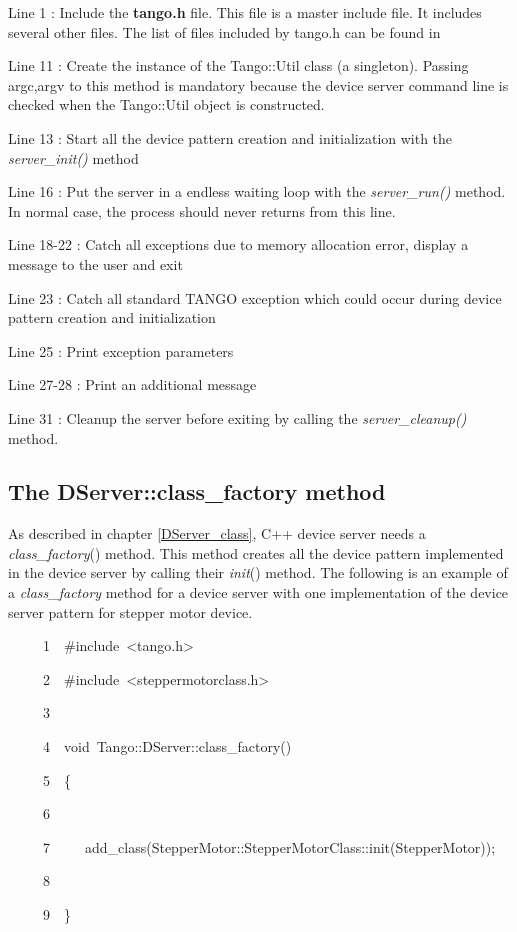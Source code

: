 

Line 1 : Include the \textbf{tango.h} file. This file is a master
include file. It includes several other files. The list of files included
by tango.h can be found in \cite{TANGO_ref_man}

Line 11 : Create the instance of the Tango::Util class
(a singleton). Passing argc,argv to this method is mandatory because
the device server command line is checked when the Tango::Util object
is constructed.

Line 13 : Start all the device pattern creation and initialization
with the \emph{server\_init()} method

Line 16 : Put the server in a endless waiting loop with the \emph{server\_run()}
method. In normal case, the process should never returns from this
line.

Line 18-22 : Catch all exceptions due to memory allocation error,
display a message to the user and exit

Line 23 : Catch all standard TANGO exception which could occur during
device pattern creation and initialization

Line 25 : Print exception parameters

Line 27-28 : Print an additional message

Line 31 : Cleanup the server before exiting by calling the \emph{server\_cleanup()}
method.

\subsection{The DServer::class\_factory method}

As described in chapter \ref{DServer_class}, C++ device server needs
a \emph{class\_factory}() method. This method creates all the device
pattern implemented in the device server by calling their \emph{init}()
method. The following is an example of a \emph{class\_factory}
method for a device server with one implementation of the device server
pattern for stepper motor device.


\begin{lyxcode}
~~~~~1~~\#include~<tango.h>

~~~~~2~~\#include~<steppermotorclass.h>

~~~~~3~~

~~~~~4~~void~Tango::DServer::class\_factory()

~~~~~5~~\{

~~~~~6~~

~~~~~7~~~~~add\_class(StepperMotor::StepperMotorClass::init(\textquotedbl{}StepperMotor\textquotedbl{}));

~~~~~8~~

~~~~~9~~\}
\end{lyxcode}


